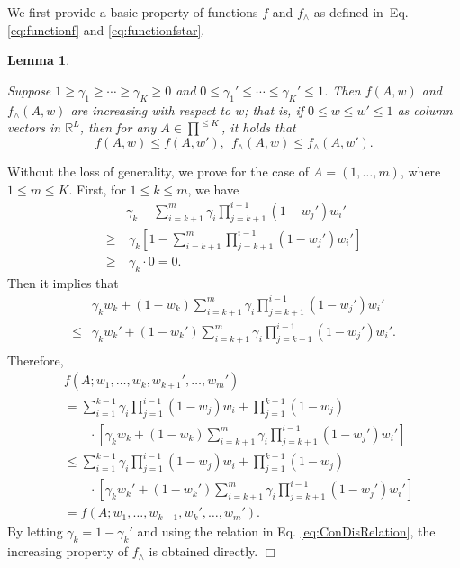 \documentclass{article}
\newcommand{\RR}{\mathbb{R}}
\newtheorem{lemma}[theorem]{Lemma}%
\newenvironment{proof}{\noindent {\textbf{Proof. }}}{$\Box$ \medskip}
\newcommand{\CLemmaIncre}{
  Suppose $1 \geq \gamma_1 \geq \cdots \geq \gamma_K \geq 0$ and $0 \leq \gamma_1' \leq \cdots \leq \gamma_K' \leq 1$. Then $f(A, w)$ and $f_{\wedge}(A, w)$ are increasing with respect to $w$; that is, if $0 \leq w \leq w' \leq 1$ as column vectors in $\RR^L$, then for any $A \in \prod^{\leq K}$, it holds that
  $$
    f(A, w) \leq f(A, w'), ~~ f_{\wedge}(A, w) \leq f_{\wedge}(A, w').
  $$
}
\begin{document}
We first provide a basic property of functions $f$ and $f_{\wedge}$ as defined in~Eq.\eqref{eq:functionf} and \eqref{eq:functionfstar}.
\begin{lemma} %
  \label{lem:increasing} 
  \CLemmaIncre
\end{lemma}
\begin{proof}
  Without the loss of generality, we prove for the case of $A = (1, \ldots, m)$, where $1 \leq m \leq K$. First, for $1 \leq k \leq m$, we have
  \begin{align*}
  	&\gamma_{k} - \sum_{i=k+1}^m \gamma_i \prod_{j = k + 1}^{i - 1} (1 - w_j') w_i'\\
  	\geq &~\gamma_k [1 - \sum_{i=k+1}^m \prod_{j=k+1}^{i-1}(1 - w_j') w_i']\\
  	\geq &~\gamma_{k} \cdot 0 = 0.
  \end{align*}
  Then it implies that
  \begin{align*}
  	&\gamma_k w_k + (1 - w_k)\sum_{i=k+1}^m \gamma_i \prod_{j=k+1}^{i-1}(1 - w_j') w_i'\\
  	\leq &\gamma_k w_k' + (1 - w_k')\sum_{i=k+1}^m \gamma_i \prod_{j=k+1}^{i-1}(1 - w_j') w_i'.\\
  \end{align*}
  Therefore, 
  \begin{align*}
  	& f(A; w_1, \dots, w_k, w_{k+1}', \dots, w_m')\\
  	&=\sum_{i=1}^{k-1} \gamma_i \prod_{j=1}^{i-1}(1 - w_j) w_i + \prod_{j=1}^{k-1}(1 - w_j) \\
  	&\qquad \cdot [\gamma_k w_k + (1 - w_k)\sum_{i=k+1}^m \gamma_i \prod_{j=k+1}^{i-1}(1 - w_j') w_i']\\
  	&\leq \sum_{i=1}^{k-1} \gamma_i \prod_{j=1}^{i-1}(1 - w_j) w_i + \prod_{j=1}^{k-1}(1 - w_j) \\
  	&\qquad \cdot [\gamma_k w_k' + (1 - w_k')\sum_{i=k+1}^m \gamma_i \prod_{j=k+1}^{i-1}(1 - w_j') w_i']\\
  	&=f(A; w_1, \ldots, w_{k-1}, w_{k}', \ldots, w_m').
  \end{align*}
  By letting $\gamma_k = 1 - \gamma_k'$ and using the relation in Eq. \eqref{eq:ConDisRelation}, the increasing property of $f_{\wedge}$ is obtained directly.
\end{proof}
\end{document}
